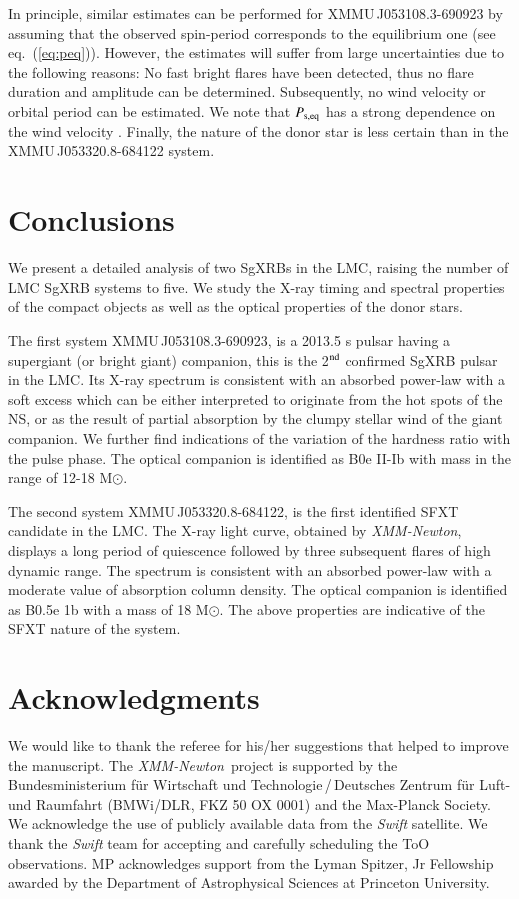 \documentclass[a4paper,fleqn,usenatbib]{mnras}
\newcommand{\swift}{{\it Swift}\xspace}
\newcommand{\xmm}{{\it XMM-Newton}\xspace}
\newcommand{\canda}{XMMU\,J053108.3-690923\xspace} %
\newcommand{\candb}{XMMU\,J053320.8-684122\xspace} %
\begin{document}
In principle, similar estimates can be performed for \canda by assuming that the observed spin-period corresponds to the equilibrium one (see eq.~(\ref{eq:peq})).
However, the estimates will suffer from large uncertainties due to the following reasons: No fast bright flares have been detected, thus no flare duration and amplitude can be determined.
Subsequently, no wind velocity or orbital period can be estimated.
We note that $P_{\rm s, eq}$ has a strong dependence on the wind velocity \citep[see also ][]{2014MNRAS.442.2325S}. 
Finally, the nature of the donor star is less certain than in the \candb system.



\section{Conclusions}

We present a detailed analysis of two SgXRBs in the LMC, raising the number of LMC SgXRB systems to five. We study the X-ray timing and spectral properties of the compact objects as well as the optical properties of the donor stars. 

The first system \canda, is a 2013.5 s pulsar having a supergiant (or bright giant) companion, this is the 2$^{\rm nd}$ confirmed SgXRB pulsar in the LMC. Its X-ray spectrum is consistent with an absorbed power-law with a soft excess which can be either interpreted to originate from the hot spots of the NS, or as the result of partial absorption by the clumpy stellar wind of the giant companion.  We further find indications of the variation of the hardness ratio with the pulse phase. The optical companion is identified as B0e II-Ib with mass in the range of 12-18 M$\odot$.

The second system \candb,  is the first identified SFXT candidate in the LMC. The X-ray light curve, obtained by \xmm, displays a long period of quiescence followed by three subsequent flares of high dynamic range. The spectrum is consistent with an absorbed power-law with a moderate value of absorption column density. The optical companion is identified as B0.5e 1b with a mass of 18 M$\odot$. 
The above properties are indicative of the SFXT nature of the system.


\section*{Acknowledgments}
We would like to thank the referee for his/her suggestions that helped to improve the manuscript.
The \xmm\ project is supported by the Bundesministerium f\"ur Wirtschaft und
Technologie\,/\,Deutsches Zentrum f\"ur Luft- und Raumfahrt (BMWi/DLR, FKZ 50 OX
0001) and the Max-Planck Society.
We acknowledge the use of publicly available data from the \swift satellite. We thank the \swift team for accepting and carefully scheduling the ToO observations.
MP acknowledges support from the Lyman Spitzer, Jr Fellowship awarded by the Department of Astrophysical Sciences at Princeton University.

% 


\end{document}
